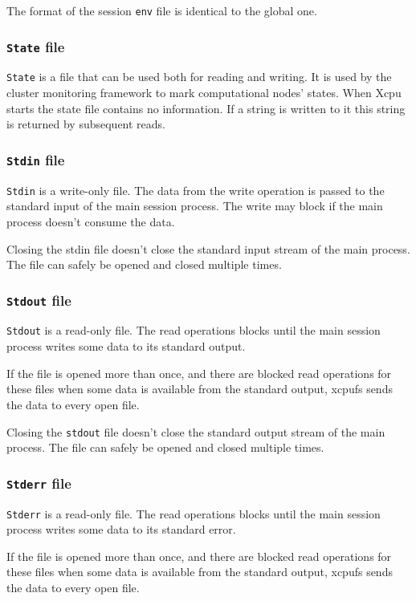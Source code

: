 \documentclass[draft]{article}
\begin{document}
The format of the session \verb|env| file is identical to the global one.

\subsubsection{{\tt State} file}

\verb|State| is a file that can be used both for reading and
writing. It is used by the cluster monitoring framework to mark
computational nodes' states. When Xcpu starts the state file contains
no information. If a string is written to it this string is returned
by subsequent reads.


\subsubsection{{\tt Stdin} file}

\verb|Stdin| is a write-only file. The data from the write operation is
passed to the standard input of the main session process. The write may
block if the main process doesn't consume the data.

Closing the stdin file doesn't close the standard input stream of the
main process. The file can safely be opened and closed multiple times.

\subsubsection{{\tt Stdout} file}

\verb|Stdout| is a read-only file. The read operations blocks until the main
session process writes some data to its standard output.

If the file is opened more than once, and there are blocked read
operations for these files when some data is available from the standard
output, xcpufs sends the data to every open file.

Closing the \verb|stdout| file doesn't close the standard output stream of the
main process. The file can safely be opened and closed multiple times.

\subsubsection{{\tt Stderr} file}

\verb|Stderr| is a read-only file. The read operations blocks until the main
session process writes some data to its standard error.

If the file is opened more than once, and there are blocked read
operations for these files when some data is available from the standard
output, xcpufs sends the data to every open file.
\end{document}

